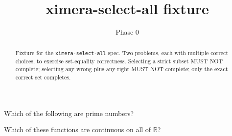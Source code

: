 \documentclass{ximera}
\title{ximera-select-all fixture}
\author{Phase 0}
\begin{document}
\begin{abstract}
Fixture for the \texttt{ximera-select-all} spec. Two problems, each with multiple correct choices, to exercise set-equality correctness. Selecting a strict subset MUST NOT complete; selecting any wrong-plus-any-right MUST NOT complete; only the exact correct set completes.
\end{abstract}

\maketitle

\begin{problem}
  Which of the following are prime numbers?
  \begin{selectAll}
  \end{selectAll}
\end{problem}

\begin{problem}
  Which of these functions are continuous on all of $\mathbb{R}$?
  \begin{selectAll}
  \end{selectAll}
\end{problem}
\end{document}
